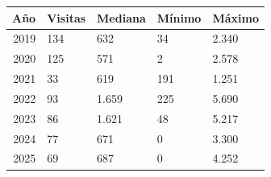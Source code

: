 \begin{tabular}{rllll}
\toprule
Año & Visitas & Mediana & Mínimo & Máximo \\
\midrule
2019 & 134 & 632 & 34 & 2.340 \\
2020 & 125 & 571 & 2 & 2.578 \\
2021 & 33 & 619 & 191 & 1.251 \\
2022 & 93 & 1.659 & 225 & 5.690 \\
2023 & 86 & 1.621 & 48 & 5.217 \\
2024 & 77 & 671 & 0 & 3.300 \\
2025 & 69 & 687 & 0 & 4.252 \\
\bottomrule
\end{tabular}
